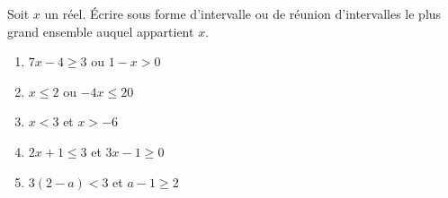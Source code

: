 
Soit $x$ un réel. Écrire sous forme d'intervalle ou de réunion d'intervalles le plus grand ensemble auquel appartient $x$.

\begin{enumerate}
	\item $7x -4 \geq 3$ ou $1-x>0$  
	\item $x \leq 2$ ou $-4x \leq 20$ 
	\item $x < 3$ et $x > -6$ 
	\item $2x+1 \leq 3$ et $3x-1 \geq 0$ 
	\item $3(2-a)<3$ et $a-1 \geq 2$ 
\end{enumerate}
 
